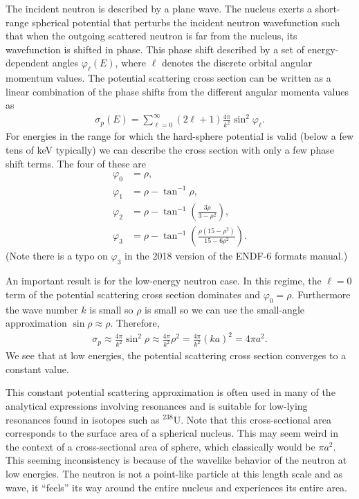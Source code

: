 The incident neutron is described by a plane wave. The nucleus exerts a short-range spherical potential that perturbs the incident neutron wavefunction such that when the outgoing scattered neutron is far from the nucleus, its wavefunction is shifted in phase. This phase shift described by a set of energy-dependent angles $\varphi_\ell(E)$, where $\ell$ denotes the discrete orbital angular momentum values. The potential scattering cross section can be written as a linear combination of the phase shifts from the different angular momenta values as
\begin{align}
  \sigma_p(E) = \sum_{\ell = 0}^\infty ( 2 \ell + 1 ) \frac{4\pi}{k^2} \sin^2 \varphi_\ell .
\end{align}
For energies in the range for which the hard-sphere potential is valid (below a few tens of keV typically) we can describe the cross section with only a few phase shift terms. The four of these are
\begin{subequations}
\begin{align}
  \varphi_0 &= \rho, \\
  \varphi_1 &= \rho - \tan^{-1}\rho , \\
  \varphi_2 &= \rho - \tan^{-1}\left( \frac{3\rho}{ 3 - \rho^2 } \right) , \\  
  \varphi_3 &= \rho - \tan^{-1}\left( \frac{\rho (15 - \rho^2 ) }{ 15 - 6 \rho^2 } \right) .
\end{align}
\end{subequations}
(Note there is a typo on $\varphi_3$ in the 2018 version of the ENDF-6 formats manual.)

An important result is for the low-energy neutron case. In this regime, the $\ell = 0$ term of the potential scattering cross section dominates and $\varphi_0 = \rho$. Furthermore the wave number $k$ is small so $\rho$ is small so we can use the small-angle approximation $\sin\rho \approx \rho$. Therefore,
\begin{align}
  \sigma_p \approx \frac{4\pi}{k^2} \sin^2 \rho \approx \frac{4\pi}{k^2} \rho^2 = \frac{4\pi}{k^2} ( ka )^2 = 4\pi a^2 .
\end{align}
We see that at low energies, the potential scattering cross section converges to a constant value. 

This constant potential scattering approximation is often used in many of the analytical expressions involving resonances and is suitable for low-lying resonances found in isotopes such as $^{238}$U. Note that this cross-sectional area corresponds to the surface area of a spherical nucleus. This may seem weird in the context of a cross-sectional area of sphere, which classically would be $\pi a^2$. This seeming inconsistency is because of the wavelike behavior of the neutron at low energies. The neutron is not a point-like particle at this length scale and as wave, it ``feels'' its way around the entire nucleus and experiences its entire area.

